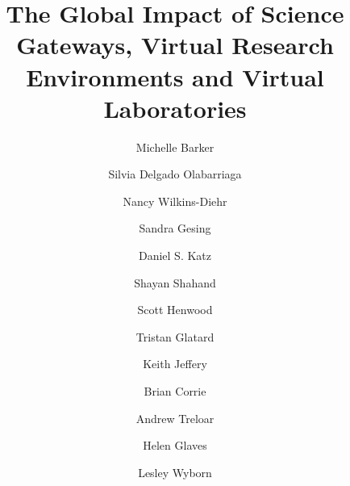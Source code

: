 \documentclass[review]{elsarticle}
\begin{document}
\begin{frontmatter}

\title{The Global Impact of Science Gateways, Virtual Research Environments and Virtual Laboratories}


\author[michele]{Michelle Barker}
\address[michele]{ 
	National eResearch Collaboration Tools and Resources, James Cook University, Australia}

\author[silvia]{Silvia Delgado Olabarriaga}
\address[silvia]{
	Academic Medical Center of the University of Amsterdam, The Netherlands
}

\author[nancy]{Nancy Wilkins-Diehr}
\address[nancy]{
	San Diego Supercomputer Center, University of California San Diego, USA
}

\author[sandra]{Sandra Gesing}
\address[sandra]{
Department of Computer Science and Engineering/Center for Research Computing, University of Notre Dame, USA}

\author[dan]{Daniel S. Katz}
\address[dan]{National Center for Supercomputing Applications, Department of Computer Science, Department of Electrical and Computer Engineering, School of Information Sciences, University of Illinois at Urbana-Champaign, USA}

\author[shayan]{Shayan Shahand} 
\address[shayan]{ServiceNow and Academic Medical Center of the University of Amsterdam, The Netherlands}

\author[scott]{Scott Henwood}
\address[scott]{CANARIE, Canada}

\author[tristan]{Tristan Glatard} 
\address[tristan]{Department of Computer Science and Software Engineering, Concordia University, Canada}

\author[keith]{Keith Jeffery}
\address[keith]{VRE4EIC and ERCIM, UK}

\author[brian]{Brian Corrie} 
\address[brian]{Simon Fraser University, Canada and New Zealand eScience Infrastructure, New Zealand}

\author[andrew]{Andrew Treloar}
\address[andrew]{Australian National Data Service, Australia}

\author[helen]{Helen Glaves} 
\address[helen]{British Geological Survey, UK}

\author[lesley]{Lesley Wyborn}
\address[lesley]{National Computational Infrastructure Facility and The Research School of Earth Sciences, Australian National University, Australia}


\end{frontmatter}
\end{document}
